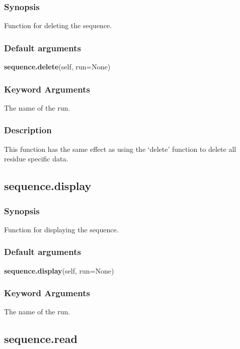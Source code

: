 \subsubsection{Synopsis}

Function for deleting the sequence.

\subsubsection{Default arguments}

\textsf{\textbf{sequence.delete}(self, run=None)}


\subsubsection{Keyword Arguments}

  The name of the run.

\subsubsection{Description}

This function has the same effect as using the `delete' function to delete all residue
specific data.


\newpage

\subsection{sequence.display}


\subsubsection{Synopsis}

Function for displaying the sequence.

\subsubsection{Default arguments}

\textsf{\textbf{sequence.display}(self, run=None)}


\subsubsection{Keyword Arguments}

  The name of the run.


\newpage

\subsection{sequence.read}


